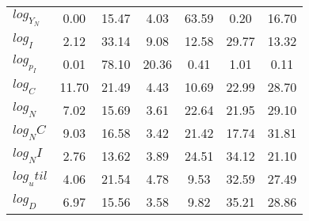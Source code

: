 \begin{center}
\begin{longtable}{lcccccc}
$log_Y_N   $	 & 	        0.00	 & 	       15.47	 & 	        4.03	 & 	       63.59	 & 	        0.20	 & 	       16.70 \\ 
$log_I     $	 & 	        2.12	 & 	       33.14	 & 	        9.08	 & 	       12.58	 & 	       29.77	 & 	       13.32 \\ 
$log_p_I   $	 & 	        0.01	 & 	       78.10	 & 	       20.36	 & 	        0.41	 & 	        1.01	 & 	        0.11 \\ 
$log_C     $	 & 	       11.70	 & 	       21.49	 & 	        4.43	 & 	       10.69	 & 	       22.99	 & 	       28.70 \\ 
$log_N     $	 & 	        7.02	 & 	       15.69	 & 	        3.61	 & 	       22.64	 & 	       21.95	 & 	       29.10 \\ 
$log_NC    $	 & 	        9.03	 & 	       16.58	 & 	        3.42	 & 	       21.42	 & 	       17.74	 & 	       31.81 \\ 
$log_NI    $	 & 	        2.76	 & 	       13.62	 & 	        3.89	 & 	       24.51	 & 	       34.12	 & 	       21.10 \\ 
$log_util  $	 & 	        4.06	 & 	       21.54	 & 	        4.78	 & 	        9.53	 & 	       32.59	 & 	       27.49 \\ 
$log_D     $	 & 	        6.97	 & 	       15.56	 & 	        3.58	 & 	        9.82	 & 	       35.21	 & 	       28.86 \\ 
\end{longtable}
 \end{center}
